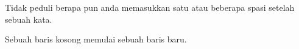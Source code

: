 \documentclass[12pt]{article}
\begin{document}
Tidak peduli berapa pun anda
memasukkan satu atau beberapa         spasi
setelah sebuah kata.

Sebuah baris kosong memulai sebuah 
baris baru.
\end{document}
